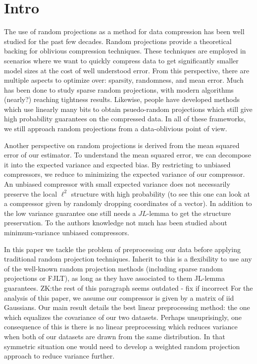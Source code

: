 \documentclass{article}
\theoremstyle{definition}
\theoremstyle{plain}
\newcommand{\zk}[1]{{\color{blue}ZK:#1}}
\begin{document}
\section{Intro}
The use of random projections as a method for data compression has been well studied for the past few decades. Random projections provide a theoretical backing for oblivious compression techniques. These techniques are employed in scenarios where we want to quickly compress data to get significantly smaller model sizes at the cost of well understood error. From this perspective, there are multiple aspects to optimize over: sparsity, randomness, and mean error. Much has been done to study sparse random projections, with modern algorithms (nearly?) reaching tightness results. Likewise, people have developed methods which use linearly many bits to obtain psuedo-random projections which still give high probability guarantees on the compressed data. In all of these frameworks, we still approach random projections from a data-oblivious point of view.

Another perspective on random projections is derived from the mean squared error of our estimator. To understand the mean squared error, we can decompose it into the expected variance and expected bias. By restricting to unbiased compressors, we reduce to minimizing the expected variance of our compressor. An unbiased compressor with small expected variance does not necessarily preserve the local $\ell^2$ structure with high probability (to see this one can look at a compressor given by randomly dropping coordinates of a vector). In addition to the low variance guarantee one still needs a $JL$-lemma to get the structure preservation. To the authors knowledge not much has been studied about minimum-variance unbiased compressors.

In this paper we tackle the problem of preprocessing our data before applying traditional random projection techniques. Inherit to this is a flexibility to use any of the well-known random projection methods (including sparse random projections or FJLT), as long as they have associated to them JL-lemma guarantees. 
\zk{the rest of this paragraph seems outdated - fix if incorrect}
For the analysis of this paper, we assume our compressor is given by a matrix of iid Gaussians. Our main result details the best linear preprocessing method: the one which equalizes the covariance of our two datasets. Perhaps unsuprisingly, one consequence of this is there is no linear preprocessing which reduces variance when both of our datasets are drawn from the same distribution. In that symmetric situation one would need to develop a weighted random projection approach to reduce variance further. 
\end{document}
